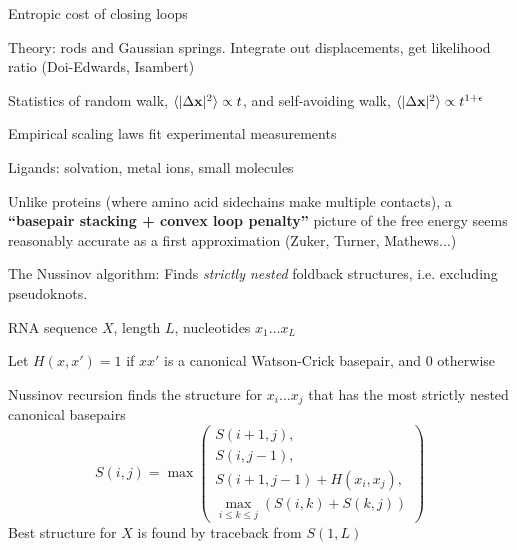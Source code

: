 \documentclass{beamer}
\begin{document}
\begin{frame}{}
 \itemb
 \item Entropic cost of closing loops
  \itemb
  \item Theory: rods and Gaussian springs. Integrate out displacements, get likelihood ratio (Doi-Edwards, Isambert)
  \item Statistics of random walk, $\langle |\Delta {\bf x}|^2 \rangle \propto t$, and self-avoiding walk, $\langle |\Delta {\bf x}|^2 \rangle \propto t^{1+\epsilon}$
  \item Empirical scaling laws fit experimental measurements
  \iteme
 \item Ligands: solvation, metal ions, small molecules
 \item Unlike proteins (where amino acid sidechains make multiple contacts),
a {\bf ``basepair stacking + convex loop penalty''} picture of the free energy seems reasonably accurate as a first approximation
(Zuker, Turner, Mathews...)
 \iteme
\end{frame}

\begin{frame}{}
\itemb
\item The Nussinov algorithm: Finds {\em strictly nested} foldback structures, i.e. excluding pseudoknots.
 \itemb
 \item RNA sequence $X$, length $L$, nucleotides $x_1 \ldots x_L$
 \item Let $H(x,x')=1$ if $xx'$ is a canonical Watson-Crick basepair, and $0$ otherwise
 \item Nussinov recursion finds the structure for $x_i \ldots x_j$ that has the most strictly nested canonical basepairs
\[
S(i,j) = \max \left( \begin{array}{c} S(i+1,j), \\ S(i,j-1), \\ S(i+1,j-1) + H(x_i,x_j), \\ \max_{i \leq k \leq j} (S(i,k) + S(k,j)) \end{array} \right)
\]
Best structure for $X$ is found by traceback from $S(1,L)$
 \iteme
\iteme
\end{frame}
\end{document}
